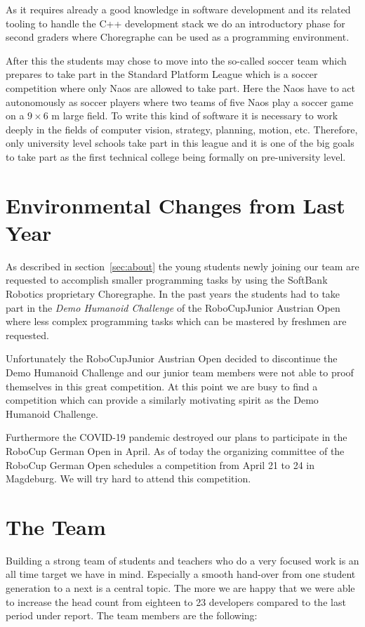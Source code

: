 \documentclass[11pt]{article}
\begin{document}
As it requires already a good knowledge in software development and its related tooling to handle the C++ development stack we do an introductory phase for second graders where Choregraphe can be used as a programming environment.

After this the students may chose to move into the so-called soccer team which prepares to take part in the Standard Platform League which is a soccer competition where only Naos are allowed to take part. Here the Naos have to act autonomously as soccer players where two teams of five Naos play a soccer game on a $9 \times 6$ m large field. To write this kind of software it is necessary to work deeply in the fields of computer vision, strategy, planning, motion, etc. Therefore, only university level schools take part in this league and it is one of the big goals to take part as the first technical college being formally on pre-university level.

\section{Environmental Changes from Last Year}
As described in section~\ref{sec:about} the young students newly joining our team are requested to accomplish smaller programming tasks by using the SoftBank Robotics proprietary Choregraphe. In the past years the students had to take part in the {\em Demo Humanoid Challenge} of the RoboCupJunior Austrian Open where less complex programming tasks which can be mastered by freshmen are requested.

Unfortunately the RoboCupJunior Austrian Open decided to discontinue the Demo Humanoid Challenge and our junior team members were not able to proof themselves in this great competition. At this point we are busy to find a competition which can provide a similarly motivating spirit as the Demo Humanoid Challenge.

Furthermore the COVID-19 pandemic destroyed our plans to participate in the RoboCup German Open in April. As of today the organizing committee of the RoboCup German Open schedules a competition from April 21 to 24 in Magdeburg. We will try hard to attend this competition.

\section{The Team}
Building a strong team of students and teachers who do a very focused work is an all time target we have in mind. Especially a smooth hand-over from one student generation to a next is a central topic. The more we are happy that we were able to increase the head count from eighteen  to 23 developers compared to the last period under report. The team members are the following: 
\end{document}
